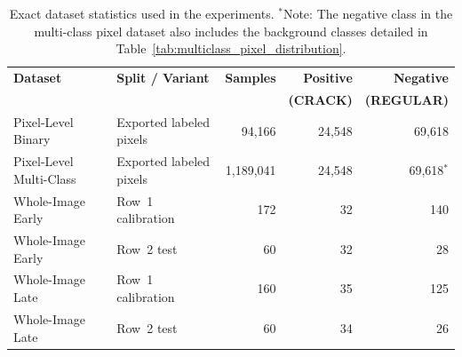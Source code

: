 \begin{table}[H]
    \centering
    \caption[Dataset statistics for all experimental splits]{Exact dataset statistics used in the experiments. $^*$Note: The negative class in the multi-class pixel dataset also includes the background classes detailed in Table~\ref{tab:multiclass_pixel_distribution}.}
    \label{tab:dataset_statistics}
    \small
    \renewcommand{\arraystretch}{1.3}
    \begin{tabular}{@{} l l r r r @{} }
        \toprule
        \textbf{Dataset} & \textbf{Split / Variant} & \textbf{Samples} & \textbf{Positive} & \textbf{Negative} \\
        & & & \textbf{(CRACK)} & \textbf{(REGULAR)} \\
        \midrule
        Pixel-Level Binary & Exported labeled pixels & 94{,}166 & 24{,}548  & 69{,}618  \\
        Pixel-Level Multi-Class & Exported labeled pixels & 1{,}189{,}041 & 24{,}548 & 69{,}618$^*$ \\
        \midrule
        Whole-Image Early & Row~1 calibration  & 172 & 32 & 140 \\
        Whole-Image Early & Row~2 test  & 60 & 32 & 28 \\
        \midrule
        Whole-Image Late & Row~1 calibration  & 160 & 35 & 125 \\
        Whole-Image Late & Row~2 test  & 60 & 34 & 26 \\
        \bottomrule
    \end{tabular}
\end{table}

\FloatBarrier






